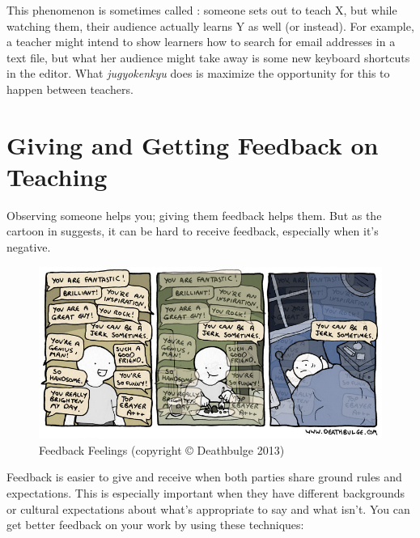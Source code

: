 This phenomenon is sometimes called
:
someone sets out to teach X, but while watching them, their audience
actually learns Y as well (or instead). For example, a teacher might
intend to show learners how to search for email addresses in a text
file, but what her audience might take away is some new keyboard
shortcuts in the editor.  What \emph{jugyokenkyu} does is maximize the
opportunity for this to happen between teachers.

\section{Giving and Getting Feedback on Teaching}\label{s:performance-feedback}

Observing someone helps you; giving them feedback helps them.  But as
the cartoon in  suggests, it
can be hard to receive feedback, especially when it's negative.

\begin{figure}
\centering
\includegraphics{../docs/fig/deathbulge-jerk.jpg}
\caption{Feedback Feelings (copyright {\copyright} Deathbulge 2013)}
\label{f:performance-feedback-feelings}
\end{figure}

Feedback is easier to give and receive when both parties share ground
rules and expectations.  This is especially important when they have
different backgrounds or cultural expectations about what's
appropriate to say and what isn't.  You can get better feedback on
your work by using these techniques:

